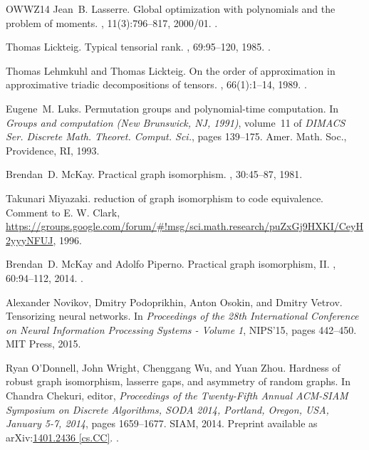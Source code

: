 \documentclass[10pt,a4paper]{article}
\theoremstyle{definition}
\begin{document}
\begin{thebibliography}{OWWZ14}
Jean~B. Lasserre.
\newblock Global optimization with polynomials and the problem of moments.
, 11(3):796--817, 2000/01.
\newblock \href {https://doi.org/10.1137/S1052623400366802}
  {}.

Thomas Lickteig.
\newblock Typical tensorial rank.
, 69:95--120, 1985.
\newblock \href {https://doi.org/10.1016/0024-3795(85)90070-9}
  {}.

Thomas Lehmkuhl and Thomas Lickteig.
\newblock On the order of approximation in approximative triadic decompositions
  of tensors.
, 66(1):1--14, 1989.
\newblock \href {https://doi.org/10.1016/0304-3975(89)90141-2}
  {}.

Eugene~M. Luks.
\newblock Permutation groups and polynomial-time computation.
\newblock In {\em Groups and computation ({N}ew {B}runswick, {NJ}, 1991)},
  volume~11 of {\em DIMACS Ser. Discrete Math. Theoret. Comput. Sci.}, pages
  139--175. Amer. Math. Soc., Providence, RI, 1993.

Brendan~D. McKay.
\newblock Practical graph isomorphism.
, 30:45--87, 1981.

Takunari Miyazaki.
 reduction of graph isomorphism to code equivalence.
\newblock Comment to E. W. Clark,
  \href{https://groups.google.com/forum/#!msg/sci.math.research/puZxGj9HXKI/CeyH2yyyNFUJ}{https://groups.google.com/forum/\#!msg/sci.math.research/puZxGj9HXKI/CeyH2yyyNFUJ},
  1996.

Brendan~D. McKay and Adolfo Piperno.
\newblock Practical graph isomorphism, {II}.
, 60:94--112, 2014.
\newblock \href {https://doi.org/10.1016/j.jsc.2013.09.003}
  {}.

Alexander Novikov, Dmitry Podoprikhin, Anton Osokin, and Dmitry Vetrov.
\newblock Tensorizing neural networks.
\newblock In {\em Proceedings of the 28th International Conference on Neural
  Information Processing Systems - Volume 1}, NIPS'15, pages 442--450. MIT
  Press, 2015.

Ryan O'Donnell, John Wright, Chenggang Wu, and Yuan Zhou.
\newblock Hardness of robust graph isomorphism, lasserre gaps, and asymmetry of
  random graphs.
\newblock In Chandra Chekuri, editor, {\em Proceedings of the Twenty-Fifth
  Annual {ACM-SIAM} Symposium on Discrete Algorithms, {SODA} 2014, Portland,
  Oregon, USA, January 5-7, 2014}, pages 1659--1677. {SIAM}, 2014.
\newblock Preprint available as
  arXiv:\href{https://arxiv.org/abs/1401.2436}{1401.2436 [cs.CC]}.
\newblock \href {https://doi.org/10.1137/1.9781611973402.120}
  {}.


\end{thebibliography}
\end{document}
